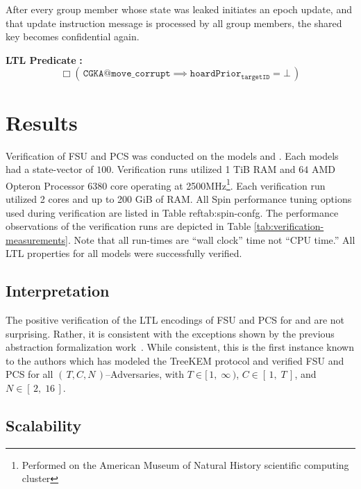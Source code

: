 \documentclass[runningheads]{llncs}
\newcommand{\Abrev}[1]{\gls{#1}}
\newcommand{\NumericRange}[2]{\ensuremath{\left[\,#1,\; #2\,\right]}\xspace}
\newcommand{\NumericRangeOpenR}[2]{\ensuremath{[\,#1,\; #2\,)}\xspace}
\begin{document}
\begin{definition}
After every group member whose state was leaked initiates an epoch update, and that update instruction message is processed by all group members, the shared key becomes confidential again.
\end{definition}%
\noindent\textbf{LTL Predicate} \textbf{:}%
\[%
\Box \left(\, \texttt{CGKA@move\_corrupt} \implies \texttt{hoardPrior}_{\texttt{targetID}} = \bot \,\right)%
\]%


\section{Results}

Verification of  \Abrev{FSU} and \Abrev{PCS} was conducted on the models  and .
Each models had a state-vector of $100$\siBytes.
Verification runs utilized 1 TiB RAM and \(64\) AMD Opteron Processor 6380 core operating at 2500MHz\footnote{Performed on the American Museum of Natural History scientific computing cluster}.
Each verification run utilized 2 cores and up to 200 GiB of RAM.
All Spin performance tuning options used during verification are listed in Table ref{tab:spin-confg}.
The performance observations of the verification runs are depicted in Table \ref{tab:verification-measurements}.
Note that all run-times are ``wall clock'' time not ``CPU time.''
All \Abrev{LTL} properties for all models were successfully verified.

\subsection{Interpretation}

The positive verification of the LTL encodings of  \Abrev{FSU} and \Abrev{PCS} for   and  are not surprising.
Rather, it is consistent with the exceptions shown by the previous \CGKAdef abstraction formalization work~\cite{alwen2020security}.
While consistent, this is the first instance known to the authors which has modeled the TreeKEM protocol and verified \Abrev{FSU} and \Abrev{PCS} for all $(\,T, C, N\,)$--Adversaries, with $T \in \NumericRangeOpenR{1}{\infty}$, $C \in \NumericRange{1}{T}$, and $N \in \NumericRange{2}{16}$.

\subsection{Scalability}
\end{document}
